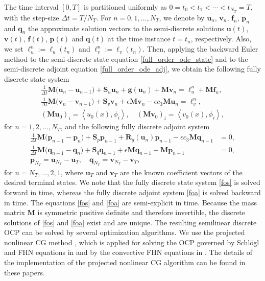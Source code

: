 \documentclass[preprint,12pt]{elsarticle}
\newcommand {\la}[1] {\left\langle {#1} \right\rangle }
\begin{document}
The time interval $[0,T]$ is partitioned uniformly as $0=t_0 < t_1 < \cdots < t_{N_T}=T$, with the step-size $\Delta t = T/N_T$. For $n=0,1,\ldots , N_T$, we denote by $\bm{u}_n$, $\bm{v}_n$, $\bm{f}_n$, $\bm{p}_n$ and $\bm{q}_n$ the approximate solution vectors to the semi-discrete solutions $\bm{u}(t)$, $\bm{v}(t)$, $\bm{f}(t)$, $\bm{p}(t)$ and $\bm{q}(t)$ at the time instance $t=t_n$, respectively. Also, we set $\bm{\ell}_u^n:=\bm{\ell}_u(t_n)$ and $\bm{\ell}_v^n:=\bm{\ell}_v(t_n)$. Then, applying the  backward Euler method to the semi-discrete state equation \eqref{full_order_ode_state} and to the semi-discrete adjoint equation \eqref{full_order_ode_adj},  we obtain the following fully discrete state system
\begin{equation}\label{fos}
\begin{aligned}
 \frac{1} {\Delta t} \bm{M} \big( \bm{u}_n - \bm{u}_{n-1} \big)  +   {\bm S}_u \bm{u}_{n} +  \bm{g}(\bm{u}_{n}) + \bm{M} \bm{v}_{n}  =  \bm{\ell}_u^n + \bm{M} \bm{f}_n, \\
 \frac{1} {\Delta t } \bm{M} \big( \bm{v}_n - \bm{v}_{n-1} \big) +  {\bm S}_v \bm{v}_n   + \epsilon \bm{M} \bm{v}_n  - \epsilon c_3 \bm{M} \bm{u}_{n} =  \bm{\ell}_v^n,\\
(\bm{M} \bm{u}_0)_i =  \la{u_0(x),\phi_i}, \quad (\bm{M} \bm{v}_0)_i = \la{v_0(x),\phi_i},
\end{aligned}
\end{equation}
for $n=1,2,\ldots, N_T$, and the following fully discrete adjoint system
\begin{equation}\label{foa}
\begin{aligned}
 \frac{1} {\Delta t } \bm{M} \big( \bm{p}_{n-1} - \bm{p}_{n} \big)  + \bm{S}_p \bm{p}_{n-1}  + \bm{R}_g(\bm{u}_{n}) \bm{p}_{n-1} - \epsilon c_3 \bm{M}\bm{q}_{n-1}  &=  0, \\
 \frac{1} {\Delta t} \bm{M} \big( \bm{q}_{n-1} - \bm{q}_{n} \big) +  \bm{S}_q \bm{q}_{n-1}  + \epsilon \bm{M} \bm{q}_{n-1} + \bm{M} \bm{p}_{n-1} &=  0,\\
\bm{p}_{N_T} = \bm{u}_{N_T}  -  \bm{u}_T, \quad
\bm{q}_{N_T} = \bm{v}_{N_T}  -  \bm{v}_T,&
\end{aligned}
\end{equation}
for $n= N_T, \ldots,2,1$, where $\bm{u}_T$ and $\bm{v}_T$ are the known coefficient vectors of the desired terminal states. We note that the fully discrete state system \eqref{fos} is solved forward in time, whereas the fully discrete adjoint system \eqref{foa} is solved backward in time. The equations \eqref{fos} and \eqref{foa} are semi-explicit in time. Because the mass matrix ${\mathbf M}$ is symmetric positive definite and therefore invertible, the discrete solutions of \eqref{fos} and \eqref{foa} exist and are unique.
The resulting semilinear discrete OCP can be solved by several optimization algorithms.
We use the  projected  nonlinear CG method  \cite{Hager06acgd}, which is applied for solving the OCP governed by Schl\"ogl and FHN equations in \cite{buchholz13ocs,Casas13, Casas15soasa,Ryll16} and by the convective FHN equations in \cite{Uzunca17}. The details of the implementation of the projected nonlinear CG algorithm can be found in these papers.
\end{document}
